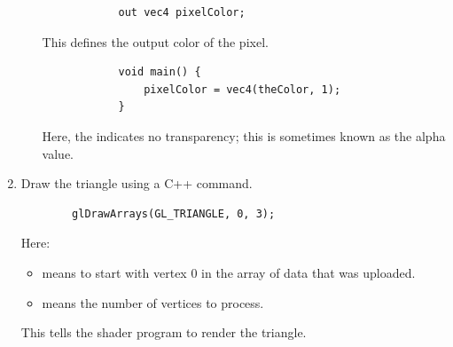 \documentclass[letterpaper]{article}
\begin{document}
\begin{enumerate}
\begin{itemize}
        \begin{verbatim}
            out vec4 pixelColor;\end{verbatim}
        This defines the output color of the pixel. 

        \begin{verbatim}
            void main() {
                pixelColor = vec4(theColor, 1);
            }\end{verbatim}
        Here, the  indicates no transparency; this is sometimes known as the alpha value. 
    \end{itemize}
    

    \item Draw the triangle using a C++ command. 
    \begin{verbatim}
        glDrawArrays(GL_TRIANGLE, 0, 3);\end{verbatim}
    Here: 
    \begin{itemize}
        \item {} means to start with vertex 0 in the array of data that was uploaded. 
        \item {} means the number of vertices to process. 
    \end{itemize}
    This tells the shader program to render the triangle.  
\end{enumerate}
\end{document}

